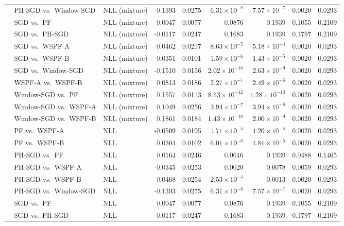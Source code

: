 {\begin{longtable}{@{}lllrrrrrr@{}}
 & PH-SGD vs.\ Window-SGD & NLL (mixture) & -0.1393 & 0.0275 & $6.31\times 10^{-8}$ & $7.57\times 10^{-7}$ & 0.0020 & 0.0293 \\
 & SGD vs.\ PF & NLL (mixture) & 0.0047 & 0.0077 & 0.0876 & 0.1939 & 0.1055 & 0.2109 \\
 & SGD vs.\ PH-SGD & NLL (mixture) & -0.0117 & 0.0247 & 0.1683 & 0.1939 & 0.1797 & 0.2109 \\
 & SGD vs.\ WSPF-A & NLL (mixture) & -0.0462 & 0.0217 & $8.63\times 10^{-5}$ & $5.18\times 10^{-4}$ & 0.0020 & 0.0293 \\
 & SGD vs.\ WSPF-B & NLL (mixture) & 0.0351 & 0.0101 & $1.59\times 10^{-6}$ & $1.43\times 10^{-5}$ & 0.0020 & 0.0293 \\
 & SGD vs.\ Window-SGD & NLL (mixture) & -0.1510 & 0.0156 & $2.02\times 10^{-10}$ & $2.63\times 10^{-9}$ & 0.0020 & 0.0293 \\
 & WSPF-A vs.\ WSPF-B & NLL (mixture) & 0.0813 & 0.0186 & $2.27\times 10^{-7}$ & $2.49\times 10^{-6}$ & 0.0020 & 0.0293 \\
 & Window-SGD vs.\ PF & NLL (mixture) & 0.1557 & 0.0113 & $8.53\times 10^{-12}$ & $1.28\times 10^{-10}$ & 0.0020 & 0.0293 \\
 & Window-SGD vs.\ WSPF-A & NLL (mixture) & 0.1049 & 0.0256 & $3.94\times 10^{-7}$ & $3.94\times 10^{-6}$ & 0.0020 & 0.0293 \\
 & Window-SGD vs.\ WSPF-B & NLL (mixture) & 0.1861 & 0.0184 & $1.43\times 10^{-10}$ & $2.00\times 10^{-9}$ & 0.0020 & 0.0293 \\
 & PF vs.\ WSPF-A & NLL & -0.0509 & 0.0195 & $1.71\times 10^{-5}$ & $1.20\times 10^{-4}$ & 0.0020 & 0.0293 \\
 & PF vs.\ WSPF-B & NLL & 0.0304 & 0.0102 & $6.01\times 10^{-6}$ & $4.81\times 10^{-5}$ & 0.0020 & 0.0293 \\
 & PH-SGD vs.\ PF & NLL & 0.0164 & 0.0246 & 0.0646 & 0.1939 & 0.0488 & 0.1465 \\
 & PH-SGD vs.\ WSPF-A & NLL & -0.0345 & 0.0253 & 0.0020 & 0.0078 & 0.0059 & 0.0293 \\
 & PH-SGD vs.\ WSPF-B & NLL & 0.0468 & 0.0254 & $2.53\times 10^{-4}$ & 0.0013 & 0.0020 & 0.0293 \\
 & PH-SGD vs.\ Window-SGD & NLL & -0.1393 & 0.0275 & $6.31\times 10^{-8}$ & $7.57\times 10^{-7}$ & 0.0020 & 0.0293 \\
 & SGD vs.\ PF & NLL & 0.0047 & 0.0077 & 0.0876 & 0.1939 & 0.1055 & 0.2109 \\
 & SGD vs.\ PH-SGD & NLL & -0.0117 & 0.0247 & 0.1683 & 0.1939 & 0.1797 & 0.2109 \\

\end{longtable}}
